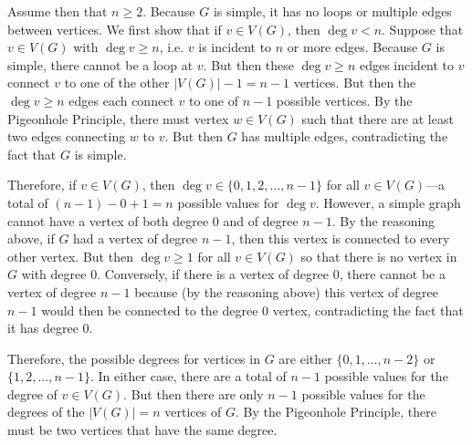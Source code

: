 \documentclass[11pt,letterpaper]{article}
\begin{document}
Assume then that $n \geq 2$. Because $G$ is simple, it has no loops or multiple edges between vertices. We first show that if $v \in V(G)$, then $\deg v < n$. Suppose that $v \in V(G)$ with $\deg v \geq n$, i.e. $v$ is incident to $n$ or more edges. Because $G$ is simple, there cannot be a loop at $v$. But then these $\deg v \geq n$ edges incident to $v$ connect $v$ to one of the other $|V(G)| - 1= n - 1$ vertices. But then the $\deg v \geq n$ edges each connect $v$ to one of $n - 1$ possible vertices. By the Pigeonhole Principle, there must vertex $w \in V(G)$ such that there are at least two edges connecting $w$ to $v$. But then $G$ has multiple edges, contradicting the fact that $G$ is simple. \pspace

Therefore, if $v \in V(G)$, then $\deg v \in \{ 0, 1, 2, \ldots, n - 1 \}$ for all $v \in V(G)$---a total of $(n - 1) - 0 + 1= n$ possible values for $\deg v$. However, a simple graph cannot have a vertex of both degree $0$ and of degree $n - 1$. By the reasoning above, if $G$ had a vertex of degree $n - 1$, then this vertex is connected to every other vertex. But then $\deg v \geq 1$ for all $v \in V(G)$ so that there is no vertex in $G$ with degree $0$. Conversely, if there is a vertex of degree $0$, there cannot be a vertex of degree $n - 1$ because (by the reasoning above) this vertex of degree $n - 1$ would then be connected to the degree $0$ vertex, contradicting the fact that it has degree $0$. \pspace

Therefore, the possible degrees for vertices in $G$ are either $\{ 0, 1, \ldots, n - 2 \}$ or $\{ 1, 2, \ldots, n - 1 \}$. In either case, there are a total of $n - 1$ possible values for the degree of $v \in V(G)$. But then there are only $n - 1$ possible values for the degrees of the $|V(G)|= n$ vertices of $G$. By the Pigeonhole Principle, there must be two vertices that have the same degree. \pspace
\end{document}
